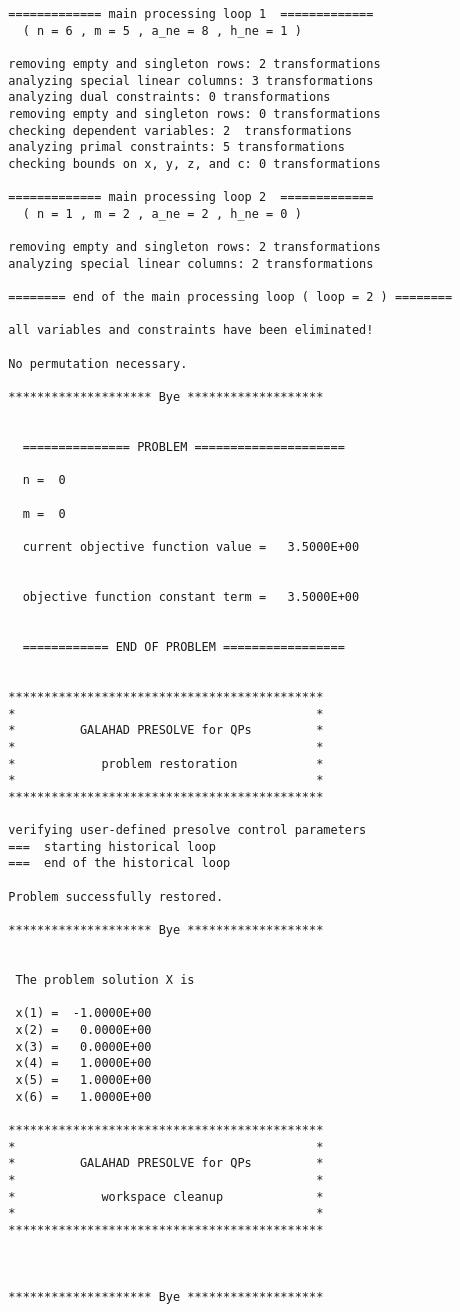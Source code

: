 \documentclass{galahad}
\begin{document}
{\begin{verbatim}
  ============= main processing loop 1  =============
    ( n = 6 , m = 5 , a_ne = 8 , h_ne = 1 )
  
  removing empty and singleton rows: 2 transformations
  analyzing special linear columns: 3 transformations
  analyzing dual constraints: 0 transformations
  removing empty and singleton rows: 0 transformations
  checking dependent variables: 2  transformations
  analyzing primal constraints: 5 transformations
  checking bounds on x, y, z, and c: 0 transformations
  
  ============= main processing loop 2  =============
    ( n = 1 , m = 2 , a_ne = 2 , h_ne = 0 )
  
  removing empty and singleton rows: 2 transformations
  analyzing special linear columns: 2 transformations
  
  ======== end of the main processing loop ( loop = 2 ) ========
  
  all variables and constraints have been eliminated!
  
  No permutation necessary.
  
  ******************** Bye *******************
  
  
    =============== PROBLEM =====================
  
    n =  0
  
    m =  0
  
    current objective function value =   3.5000E+00
  
  
    objective function constant term =   3.5000E+00
  
  
    ============ END OF PROBLEM =================
  
  
  ********************************************
  *                                          *
  *         GALAHAD PRESOLVE for QPs         *
  *                                          *
  *            problem restoration           *
  *                                          *
  ********************************************
  
  verifying user-defined presolve control parameters
  ===  starting historical loop
  ===  end of the historical loop
  
  Problem successfully restored.
  
  ******************** Bye *******************
  
  
   The problem solution X is
  
   x(1) =  -1.0000E+00
   x(2) =   0.0000E+00
   x(3) =   0.0000E+00
   x(4) =   1.0000E+00
   x(5) =   1.0000E+00
   x(6) =   1.0000E+00
  
  ********************************************
  *                                          *
  *         GALAHAD PRESOLVE for QPs         *
  *                                          *
  *            workspace cleanup             *
  *                                          *
  ********************************************
  
  
  
  ******************** Bye *******************
  
\end{verbatim}
}
\end{document}
